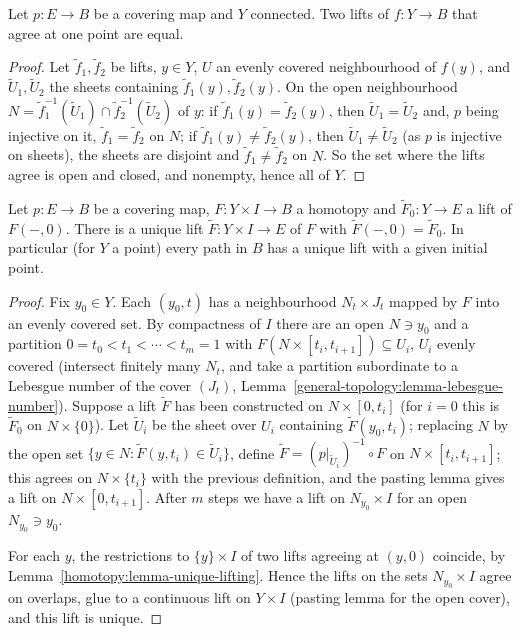 \begin{lemma}\label{homotopy:lemma-unique-lifting}
Let $p \colon E \to B$ be a covering map and $Y$ connected. Two lifts of $f \colon Y \to B$ that agree at one point are equal.
\end{lemma}

\begin{proof}
Let $\tilde{f}_1, \tilde{f}_2$ be lifts, $y \in Y$, $U$ an evenly covered neighbourhood of $f(y)$, and $\tilde{U}_1, \tilde{U}_2$ the sheets containing
$\tilde{f}_1(y), \tilde{f}_2(y)$. On the open neighbourhood $N = \tilde{f}_1^{-1}(\tilde{U}_1) \cap \tilde{f}_2^{-1}(\tilde{U}_2)$ of $y$: if
$\tilde{f}_1(y) = \tilde{f}_2(y)$, then $\tilde{U}_1 = \tilde{U}_2$ and, $p$ being injective on it, $\tilde{f}_1 = \tilde{f}_2$ on $N$; if
$\tilde{f}_1(y) \neq \tilde{f}_2(y)$, then $\tilde{U}_1 \neq \tilde{U}_2$ (as $p$ is injective on sheets), the sheets are disjoint and $\tilde{f}_1 \neq \tilde{f}_2$
on $N$. So the set where the lifts agree is open and closed, and nonempty, hence all of $Y$.
\end{proof}

\begin{proposition}\label{homotopy:proposition-homotopy-lifting}
Let $p \colon E \to B$ be a covering map, $F \colon Y \times I \to B$ a homotopy and $\tilde{F}_0 \colon Y \to E$ a lift of $F(-, 0)$. There is a unique lift
$\tilde{F} \colon Y \times I \to E$ of $F$ with $\tilde{F}(-, 0) = \tilde{F}_0$. In particular (for $Y$ a point) every path in $B$ has a unique lift with a
given initial point.
\end{proposition}

\begin{proof}
Fix $y_0 \in Y$. Each $(y_0, t)$ has a neighbourhood $N_t \times J_t$ mapped by $F$ into an evenly covered set. By compactness of $I$ there are an open
$N \ni y_0$ and a partition $0 = t_0 < t_1 < \cdots < t_m = 1$ with $F(N \times [t_i, t_{i+1}]) \subseteq U_i$, $U_i$ evenly covered (intersect finitely many
$N_t$, and take a partition subordinate to a Lebesgue number of the cover $(J_t)$, Lemma~\ref{general-topology:lemma-lebesgue-number}). Suppose a lift
$\tilde{F}$ has been constructed on $N \times [0, t_i]$ (for $i = 0$ this is $\tilde{F}_0$ on $N \times \{0\}$). Let $\tilde{U}_i$ be the sheet over $U_i$
containing $\tilde{F}(y_0, t_i)$; replacing $N$ by the open set $\{y \in N : \tilde{F}(y, t_i) \in \tilde{U}_i\}$, define
$\tilde{F} = (p|_{\tilde{U}_i})^{-1} \circ F$ on $N \times [t_i, t_{i+1}]$; this agrees on $N \times \{t_i\}$ with the previous definition, and the pasting lemma
gives a lift on $N \times [0, t_{i+1}]$. After $m$ steps we have a lift on $N_{y_0} \times I$ for an open $N_{y_0} \ni y_0$.

For each $y$, the restrictions to $\{y\} \times I$ of two lifts agreeing at $(y, 0)$ coincide, by Lemma~\ref{homotopy:lemma-unique-lifting}. Hence the lifts on
the sets $N_{y_0} \times I$ agree on overlaps, glue to a continuous lift on $Y \times I$ (pasting lemma for the open cover), and this lift is unique.
\end{proof}


